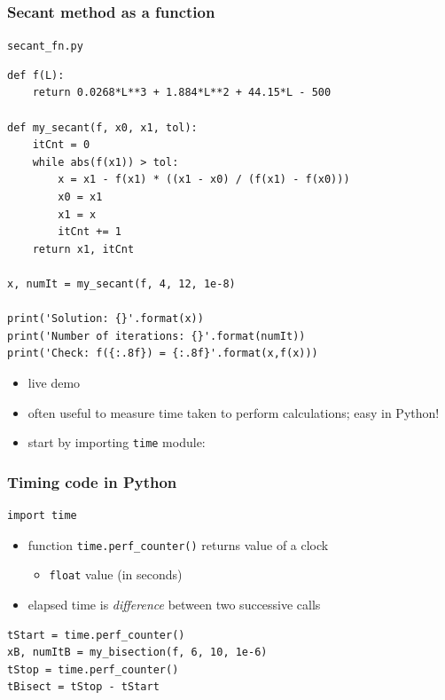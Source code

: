 \documentclass[english,14pt]{beamer}
\begin{document}
\begin{frame}[fragile]

\frametitle{Secant method as a function}

\texttt{secant\_fn.py}
\begin{lstlisting}[style=CStyle,basicstyle=\scriptsize]
def f(L):
    return 0.0268*L**3 + 1.884*L**2 + 44.15*L - 500

def my_secant(f, x0, x1, tol):
    itCnt = 0
    while abs(f(x1)) > tol:
        x = x1 - f(x1) * ((x1 - x0) / (f(x1) - f(x0)))
        x0 = x1
        x1 = x
        itCnt += 1
    return x1, itCnt

x, numIt = my_secant(f, 4, 12, 1e-8)

print('Solution: {}'.format(x))
print('Number of iterations: {}'.format(numIt))
print('Check: f({:.8f}) = {:.8f}'.format(x,f(x)))
\end{lstlisting}

\begin{itemize}
	\item live demo
\end{itemize}

\end{frame}


\begin{frame}[fragile]

\begin{itemize}
	\item often useful to measure time taken to perform calculations; easy in Python!
	\item start by importing \texttt{time} module:
\end{itemize}

\frametitle{Timing code in Python}
\begin{lstlisting}[style=CStyle,basicstyle=\scriptsize]
import time
\end{lstlisting}

\begin{itemize}
	\item function \texttt{time.perf\_counter()} returns value of a clock
	\begin{itemize}
		\item \texttt{float} value (in seconds) 
	\end{itemize}
	\item elapsed time is \emph{difference} between two successive calls
\end{itemize}

\begin{lstlisting}[style=CStyle,basicstyle=\scriptsize]
tStart = time.perf_counter()
xB, numItB = my_bisection(f, 6, 10, 1e-6)
tStop = time.perf_counter()
tBisect = tStop - tStart
\end{lstlisting}

\end{frame}
\end{document}
